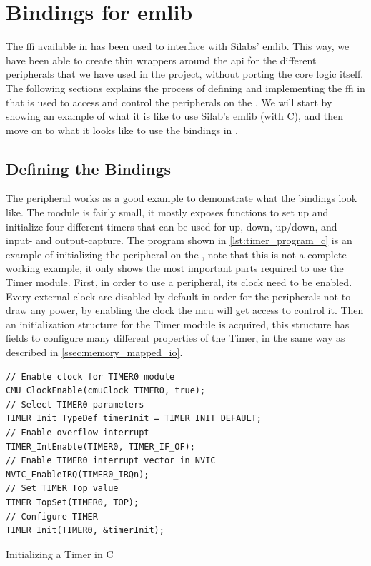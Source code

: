 
\section{Bindings for emlib}
\label{sub:interfacing_with_emlib}

The \gls{ffi} available in {\rust} has been used to interface with Silabs' emlib.
This way, we have been able to create thin wrappers around the \gls{api} for the different peripherals that we have used in the project, without porting the core logic itself.
The following sections explains the process of defining and implementing the \gls{ffi} in {\rust} that is used to access and control the peripherals on the {\gecko}.
We will start by showing an example of what it is like to use Silab's emlib (with C), and then move on to what it looks like to use the bindings in {\rust}.

\subsection{Defining the Bindings}

The  peripheral \cite{an0014_timer} works as a good example to demonstrate what the {\rust} bindings look like.
The module is fairly small, it mostly exposes functions to set up and initialize four different timers that can be used for up, down, up/down, and input- and output-capture.
The program shown in \autoref{lst:timer_program_c} is an example of initializing the  peripheral on the {\gecko}, note that this is not a complete working example, it only shows the most important parts required to use the Timer module.
First, in order to use a peripheral, its clock need to be enabled.
Every external clock are disabled by default  in order for the peripherals not to draw any power, by enabling the clock the \gls{mcu} will get access to control it.
Then an initialization structure for the Timer module is acquired, this structure has fields to configure many different properties of the Timer, in the same way as described in \autoref{ssec:memory_mapped_io}.

\begin{listing}[h]
\begin{verbatim}
// Enable clock for TIMER0 module
CMU_ClockEnable(cmuClock_TIMER0, true);
// Select TIMER0 parameters
TIMER_Init_TypeDef timerInit = TIMER_INIT_DEFAULT;
// Enable overflow interrupt
TIMER_IntEnable(TIMER0, TIMER_IF_OF);
// Enable TIMER0 interrupt vector in NVIC
NVIC_EnableIRQ(TIMER0_IRQn);
// Set TIMER Top value
TIMER_TopSet(TIMER0, TOP);
// Configure TIMER
TIMER_Init(TIMER0, &timerInit);
\end{verbatim}
\caption{Initializing a Timer in C}
\label{lst:timer_program_c}
\end{listing}

